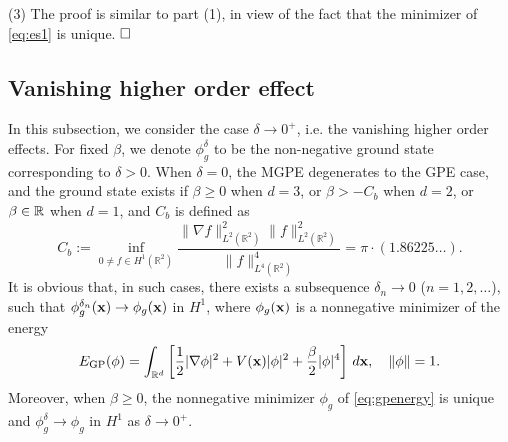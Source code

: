 \documentclass{elsarticle}
\newcommand{\vep}{\varepsilon}
\newcommand{\be}{\begin{equation}}
\newcommand{\ee}{\end{equation}}
\newtheorem{remark}{Remark}[section]
\newcommand{\bx}{{\bf x} }
\renewcommand{\ldots}{\dotsc}
\begin{document}
(3) The proof is similar to part (1), in view of the fact that the minimizer of \eqref{eq:es1} is unique.
$\hfill\Box$
%


\subsection{Vanishing higher order effect}
In this subsection, we consider the case $\delta\to0^+$, i.e. the vanishing higher order effects.
For fixed $\beta$, we denote $\phi_g^{\delta}$ to be the non-negative ground state corresponding to $\delta>0$.
When $\delta=0$, the MGPE degenerates to the GPE case, and the ground state exists \cite{Bao2013}
if $\beta\ge0$ when $d=3$, or $\beta>-C_b$ when $d=2$, or $\beta\in\Bbb R$ when $d=1$,   and $C_b$ is
defined as \cite{Weinstein,Guo}
\be\label{bestc}
C_b:=\inf_{0\ne f\in H^1({\mathbb R}^2)} \frac{\|\nabla
f\|_{L^2(\mathbb R^2)}^2\|f\|_{L^2(\mathbb R^2)}^2}{\|f\|_{L^4(\mathbb R^2)}^4}=\pi\cdot (1.86225\ldots).
\ee
It is obvious that, in such cases, there exists a subsequence $\delta_n\to0$ ($n=1,2,\ldots$), such that $\phi_g^{\delta_n}(\bx)\to\phi_g(\bx)$ in $H^1$,
where $\phi_g(\bx)$ is a  nonnegative minimizer of the energy
\be\label{eq:gpenergy}
E_{\rm GP}(\phi)=\int_{\Bbb R^d}\left[\frac{1}{2}|\nabla\phi|^2+V(\bx)|\phi|^2+\frac{\beta}{2}|\phi|^4\right]\,d\bx,\quad \|\phi\|=1.
\ee
Moreover, when $\beta\ge0$, the nonnegative minimizer $\phi_g$ of \eqref{eq:gpenergy} is unique and $\phi_g^\delta\to\phi_g$  in $H^1$ as $\delta\to0^+$.
\end{document}
